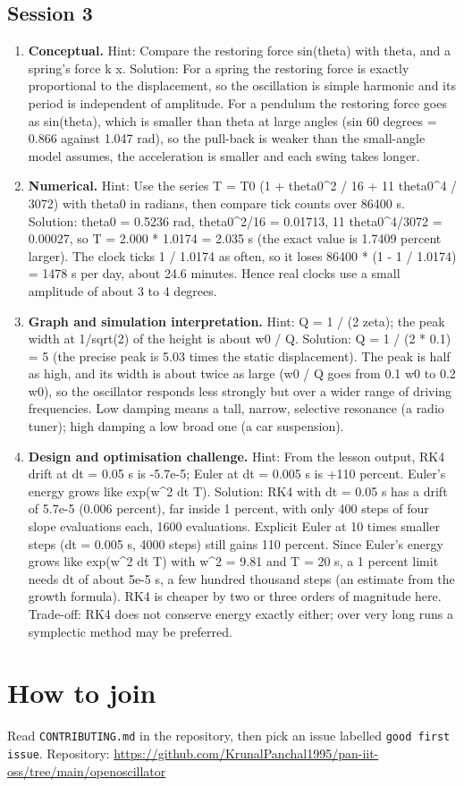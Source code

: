 \documentclass[11pt,a4paper]{article}
\begin{document}
\subsection*{Session 3}
\begin{enumerate}[nosep]
\item \textbf{Conceptual.} Hint: Compare the restoring force sin(theta) with theta, and a spring's force k x. Solution: For a spring the restoring force is exactly proportional to the displacement, so the oscillation is simple harmonic and its period is independent of amplitude. For a pendulum the restoring force goes as sin(theta), which is smaller than theta at large angles (sin 60 degrees = 0.866 against 1.047 rad), so the pull-back is weaker than the small-angle model assumes, the acceleration is smaller and each swing takes longer.
\item \textbf{Numerical.} Hint: Use the series T = T0 (1 + theta0\textasciicircum{}2 / 16 + 11 theta0\textasciicircum{}4 / 3072) with theta0 in radians, then compare tick counts over 86400 s. Solution: theta0 = 0.5236 rad, theta0\textasciicircum{}2/16 = 0.01713, 11 theta0\textasciicircum{}4/3072 = 0.00027, so T = 2.000 * 1.0174 = 2.035 s (the exact value is 1.7409 percent larger). The clock ticks 1 / 1.0174 as often, so it loses 86400 * (1 - 1 / 1.0174) = 1478 s per day, about 24.6 minutes. Hence real clocks use a small amplitude of about 3 to 4 degrees.
\item \textbf{Graph and simulation interpretation.} Hint: Q = 1 / (2 zeta); the peak width at 1/sqrt(2) of the height is about w0 / Q. Solution: Q = 1 / (2 * 0.1) = 5 (the precise peak is 5.03 times the static displacement). The peak is half as high, and its width is about twice as large (w0 / Q goes from 0.1 w0 to 0.2 w0), so the oscillator responds less strongly but over a wider range of driving frequencies. Low damping means a tall, narrow, selective resonance (a radio tuner); high damping a low broad one (a car suspension).
\item \textbf{Design and optimisation challenge.} Hint: From the lesson output, RK4 drift at dt = 0.05 s is -5.7e-5; Euler at dt = 0.005 s is +110 percent. Euler's energy grows like exp(w\textasciicircum{}2 dt T). Solution: RK4 with dt = 0.05 s has a drift of 5.7e-5 (0.006 percent), far inside 1 percent, with only 400 steps of four slope evaluations each, 1600 evaluations. Explicit Euler at 10 times smaller steps (dt = 0.005 s, 4000 steps) still gains 110 percent. Since Euler's energy grows like exp(w\textasciicircum{}2 dt T) with w\textasciicircum{}2 = 9.81 and T = 20 s, a 1 percent limit needs dt of about 5e-5 s, a few hundred thousand steps (an estimate from the growth formula). RK4 is cheaper by two or three orders of magnitude here. Trade-off: RK4 does not conserve energy exactly either; over very long runs a symplectic method may be preferred.
\end{enumerate}

\section{How to join}
Read \texttt{CONTRIBUTING.md} in the repository, then pick an issue labelled \texttt{good first issue}. Repository: \url{https://github.com/KrunalPanchal1995/pan-iit-oss/tree/main/openoscillator}
\end{document}
